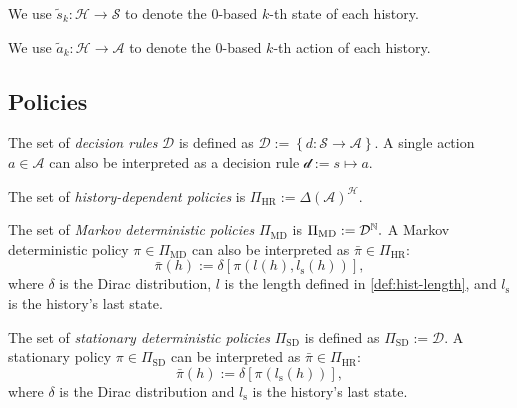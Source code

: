 \begin{definition}
  We use $\tilde{s}_k\colon \mathcal{H} \to \mathcal{S}$ to denote the 0-based $k$-th state of each history.
  \leanok
\end{definition}

\begin{definition}
  We use $\tilde{a}_k\colon \mathcal{H} \to \mathcal{A}$ to denote the 0-based $k$-th action of each history.
  \leanok
\end{definition}

\subsection{Policies}

\begin{definition} \label{def:decision-rule}
The set of \emph{decision rules} $\mathcal{D}$ is defined as \(\mathcal{D} := \left\{ d \colon \mathcal{S} \to \mathcal{A} \right\}. \) A single action $a \in \mathcal{A}$ can also be interpreted as a decision rule $\mathcal{d} := s \mapsto a$.
\leanok
\end{definition}

\begin{definition} \label{def:policy-hr}
The set of \emph{history-dependent policies} is \(\Pi_{\mathrm{HR}} :=  \Delta(\mathcal{A})^{\mathcal{H}}. \)
 \leanok
\end{definition}


\begin{definition} \label{def:policy-md}
The set of \emph{Markov deterministic policies} $\Pi_{\mathrm{MD}}$ is \(\Pi_{\mathrm{MD}} :=  \mathcal{D}^{\mathbb{N}}. \)
A Markov deterministic policy $\pi \in \Pi_{\mathrm{MD}}$ can also be interpreted as $\bar{\pi} \in \Pi_{\mathrm{HR}}$:
\[
  \bar{\pi}(h) := \delta \left[  \pi(l(h), l_{\mathrm{s}}(h)) \right],
\]
where $\delta$ is the Dirac distribution, $l$ is the length defined in \cref{def:hist-length}, and $l_{\mathrm{s}}$ is the history's last state.
\leanok
\end{definition}

\begin{definition} \label{def:policy-sd}
The set of \emph{stationary deterministic policies} $\Pi_{\mathrm{SD}}$ is defined as \(\Pi_{\mathrm{SD}} := \mathcal{D}. \)
A stationary policy $\pi \in \Pi_{\mathrm{SD}}$ can be interpreted as $\bar{\pi} \in \Pi_{\mathrm{HR}}$:
\[
  \bar{\pi}(h) := \delta \left[  \pi(l_{\mathrm{s}}(h)) \right],
\]
where $\delta$ is the Dirac distribution and $l_{\mathrm{s}}$ is the history's last state.
\leanok
\end{definition}

